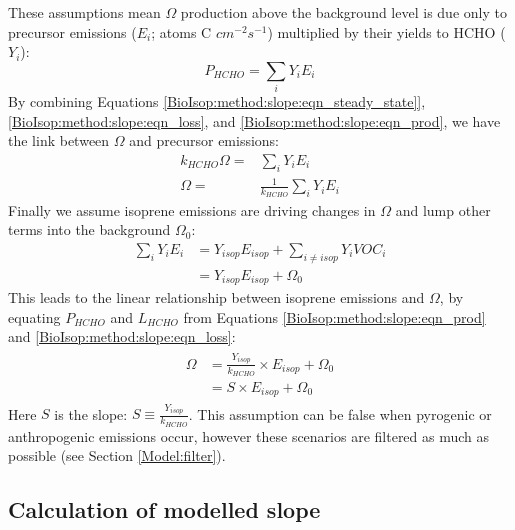     These assumptions mean $\Omega$ production above the background level is due only to precursor emissions ($E_i$; atoms C $cm^{-2} s^{-1}$) multiplied by their yields to HCHO ($Y_i$):
    \begin{equation}
      \label{BioIsop:method:slope:eqn_prod}
      P_{HCHO}  = \sum_i Y_i E_i 
    \end{equation}
    By combining Equations \ref{BioIsop:method:slope:eqn_steady_state]}, \ref{BioIsop:method:slope:eqn_loss}, and \ref{BioIsop:method:slope:eqn_prod}, we have the link between $\Omega$ and precursor emissions:
    \begin{eqnarray*}
      k_{HCHO} \Omega = & \sum_i Y_i E_i \\
      \Omega = & \frac{1}{k_{HCHO}} \sum_i Y_i E_i
    \end{eqnarray*}
    Finally we assume isoprene emissions are driving changes in $\Omega$ \parencite[as performed elsewhere, e.g.][]{Palmer2003,Millet2008,Marais2014,Stavrakou2015} and lump other terms into the background $\Omega_0$:
    \begin{eqnarray*}
      \sum_i Y_i E_i  & = Y_{isop} E_{isop} + \sum_{i \ne isop} Y_{i} VOC_{i} \\
      & = Y_{isop} E_{isop} + \Omega_0
    \end{eqnarray*}
    This leads to the linear relationship between isoprene emissions and $\Omega$, by equating $P_{HCHO}$ and $L_{HCHO}$ from Equations \ref{BioIsop:method:slope:eqn_prod} and \ref{BioIsop:method:slope:eqn_loss}:
    \begin{eqnarray} 
      \label{BioIsop:method:slope:eqn_isop_to_hcho}
      \begin{split}
        \Omega 
        & = \frac{Y_{isop}}{k_{HCHO}} \times E_{isop} + \Omega_0 \\
        & = S \times E_{isop} + \Omega_0
      \end{split} 
    \end{eqnarray}
    Here $S$ is the slope: $S \equiv \frac{Y_{isop}}{k_{HCHO}}$.
    This assumption can be false when pyrogenic or anthropogenic emissions occur, however these scenarios are filtered as much as possible (see Section \ref{Model:filter}).
    
    
  \subsection{Calculation of modelled slope}
    \label{BioIsop:method:slope_calc}
    
